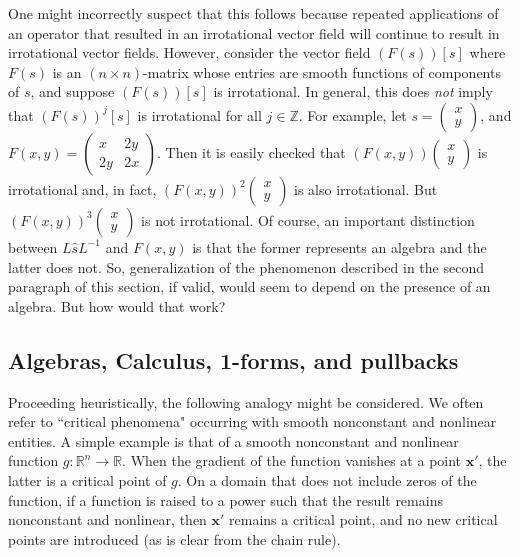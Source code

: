 \documentclass{amsart}
\theoremstyle{definition}
\numberwithin{theorem}{section}
\numberwithin{equation}{section}
\begin{document}
One might incorrectly suspect that this follows because repeated applications of an operator that resulted in an irrotational vector field will continue to result in irrotational vector fields.  However, consider the vector field $(F(s))[s]$ where $F(s)$ is an $(n\times n)$-matrix whose entries are smooth functions of components of $s$, and suppose $(F(s))[s]$ is irrotational.  In general, this does {\it not} imply that $(F(s))^j[s]$ is irrotational for all $j\in\mathbb{Z}$. For example, let \mbox{$s=\left(\begin{array}{ccc}
 x   \\ 
y    
\end{array}\right)$,} and \mbox{$F(x,y)= \left(\begin{array}{ccc}
x  & 2y   \\ 
 2y & 2x    
\end{array}\right)$.}  Then it is easily checked that $(F(x,y))\left(\begin{array}{ccc}
 x   \\ 
y    
\end{array}\right)$ is \mbox{irrotational} and, in fact, $(F(x,y))^2\left(\begin{array}{ccc}
 x   \\ 
y    
\end{array}\right)$ is also irrotational.  But $(F(x,y))^3\left(\begin{array}{ccc}
 x   \\ 
y    
\end{array}\right)$ is not irrotational.  Of course, an important distinction between $L\hat{s}L^{-1}$ and $F(x,y)$ is that the former represents an algebra and the latter does not.  So, generalization of the phenomenon described in the second paragraph of this section, if valid, would seem to depend on the presence of an algebra.  But how would that work?

\subsection{Algebras, Calculus, 1-forms, and pullbacks} Proceeding heuristically, the following analogy might be considered.  We often refer to ``critical phenomena" occurring with smooth nonconstant and nonlinear entities.  A simple example is that of a smooth nonconstant and nonlinear function $g:\mathbb{R}^n\rightarrow \mathbb{R}$.  When the gradient of the function vanishes at a point $\mathbf{x'}$, the latter is a critical point of $g$.  On a domain that does not include zeros of the function, if a function is raised to a power such that the result remains nonconstant and nonlinear, then $\mathbf{x'}$ remains a critical point, and no new critical points are introduced (as is clear from the chain rule).   
\end{document}
